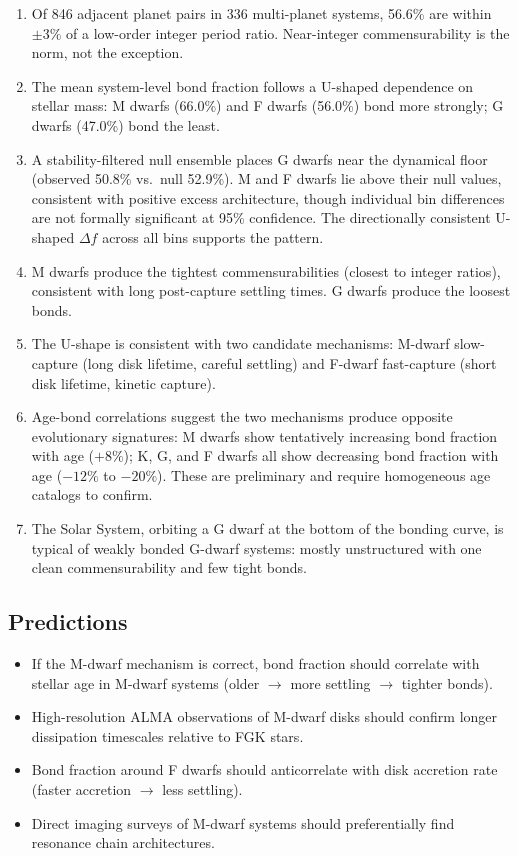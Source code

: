 \documentclass[twocolumn]{aastex631}
\begin{document}
\begin{enumerate}
  \item Of 846 adjacent planet pairs in 336 multi-planet systems, 56.6\% are
        within $\pm 3\%$ of a low-order integer period ratio. Near-integer
        commensurability is the norm, not the exception.
  \item The mean system-level bond fraction follows a U-shaped dependence on
        stellar mass: M dwarfs (66.0\%) and F dwarfs (56.0\%) bond more
        strongly; G dwarfs (47.0\%) bond the least.
  \item A stability-filtered null ensemble places G dwarfs near the dynamical
        floor (observed 50.8\% vs.\ null 52.9\%). M and F dwarfs lie above
        their null values, consistent with positive excess architecture,
        though individual bin differences are not formally significant at 95\%
        confidence. The directionally consistent U-shaped $\Delta f$ across all
        bins supports the pattern.
  \item M dwarfs produce the tightest commensurabilities (closest to integer
        ratios), consistent with long post-capture settling times. G dwarfs
        produce the loosest bonds.
  \item The U-shape is consistent with two candidate mechanisms: M-dwarf
        slow-capture (long disk lifetime, careful settling) and F-dwarf
        fast-capture (short disk lifetime, kinetic capture).
  \item Age-bond correlations suggest the two mechanisms produce opposite
        evolutionary signatures: M dwarfs show tentatively increasing bond
        fraction with age ($+8\%$); K, G, and F dwarfs all show decreasing
        bond fraction with age ($-12\%$ to $-20\%$). These are preliminary and
        require homogeneous age catalogs to confirm.
  \item The Solar System, orbiting a G dwarf at the bottom of the bonding
        curve, is typical of weakly bonded G-dwarf systems: mostly unstructured
        with one clean commensurability and few tight bonds.
\end{enumerate}

\subsection{Predictions}
\begin{itemize}
  \item If the M-dwarf mechanism is correct, bond fraction should correlate
        with stellar age in M-dwarf systems (older $\rightarrow$ more settling
        $\rightarrow$ tighter bonds).
  \item High-resolution ALMA observations of M-dwarf disks should confirm
        longer dissipation timescales relative to FGK stars.
  \item Bond fraction around F dwarfs should anticorrelate with disk accretion
        rate (faster accretion $\rightarrow$ less settling).
  \item Direct imaging surveys of M-dwarf systems should preferentially find
        resonance chain architectures.
\end{itemize}
\end{document}
